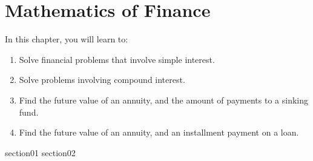 \chapter{Mathematics of Finance}\label{chapter_mathematics_of_finance}

In this chapter, you will learn to:
\begin{enumerate}
    \item Solve financial problems that involve simple interest.
    \item Solve problems involving compound interest.
    \item Find the future value of an annuity, and the amount of payments to a sinking fund.
    \item Find the future value of an annuity, and an installment payment on a loan.
\end{enumerate}


{section01}
{section02}
